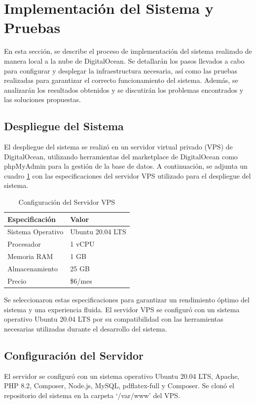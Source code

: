 \section{Implementación del Sistema y Pruebas}
En esta sección, se describe el proceso de implementación del sistema realizado de manera local a la nube de DigitalOcean. Se detallarán los pasos llevados a cabo para configurar y desplegar la infraestructura necesaria, así como las pruebas realizadas para garantizar el correcto funcionamiento del sistema. Además, se analizarán los resultados obtenidos y se discutirán los problemas encontrados y las soluciones propuestas.

\subsection{Despliegue del Sistema}
El despliegue del sistema se realizó en un servidor virtual privado (VPS) de DigitalOcean, utilizando herramientas del marketplace de DigitalOcean como phpMyAdmin para la gestión de la base de datos. A continuación, se adjunta un cuadro \ref{tab:configuracion-servidor} con las especificaciones del servidor VPS utilizado para el despliegue del sistema.

\begin{table}[H]
    \centering
    \begin{tabular}{|p{5cm}|p{5cm}|}
        \hline
        \textbf{Especificación} & \textbf{Valor} \\
        \hline
        Sistema Operativo & Ubuntu 20.04 LTS \\
        Procesador & 1 vCPU \\
        Memoria RAM & 1 GB \\
        Almacenamiento & 25 GB \\
        Precio & \$6/mes \\
        \hline
    \end{tabular}
    \caption{Configuración del Servidor VPS}
    \label{tab:configuracion-servidor}
\end{table}

Se seleccionaron estas especificaciones para garantizar un rendimiento óptimo del sistema y una experiencia fluida. El servidor VPS se configuró con un sistema operativo Ubuntu 20.04 LTS por su compatibilidad con las herramientas necesarias utilizadas durante el desarrollo del sistema.

\subsection{Configuración del Servidor}
El servidor se configuró con un sistema operativo Ubuntu 20.04 LTS, Apache, PHP 8.2, Composer, Node.js, MySQL, pdflatex-full y Composer. Se clonó el repositorio del sistema en la carpeta `/var/www' del VPS. 

